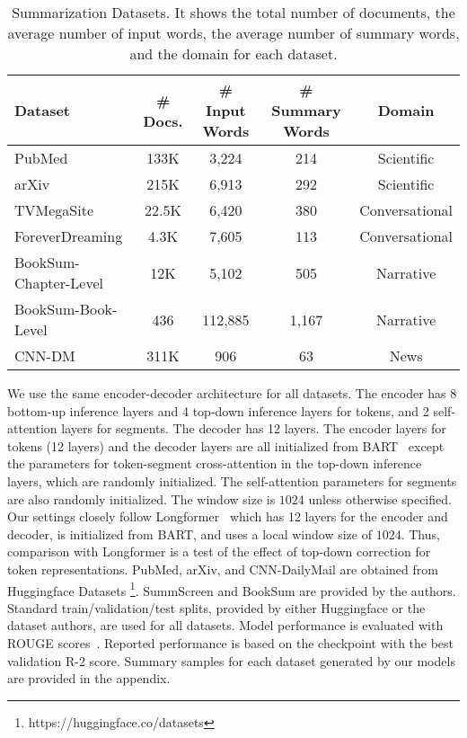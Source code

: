 \documentclass{article} \usepackage{iclr2022_conference,times}
\begin{document}
\begin{table*}[h!]
\small
\centering
\begin{tabular}{l c c c c} 
\toprule
Dataset & \# Docs. & \# Input Words & \# Summary Words & Domain\\
\hline
PubMed &133K & 3,224 & 214 & Scientific \\ 
arXiv &215K & 6,913 & 292 & Scientific \\ 
TVMegaSite & 22.5K & 6,420 & 380 & Conversational \\
ForeverDreaming & 4.3K & 7,605 & 113  & Conversational \\
BookSum-Chapter-Level & 12K & 5,102 & 505 & Narrative \\
BookSum-Book-Level & 436 & 112,885 & 1,167 & Narrative \\
CNN-DM & 311K & 906 & 63 & News \\ 
\hline
\end{tabular}
\caption{\scriptsize Summarization Datasets. It shows the total number of documents, the average number of input words, the average number of summary words, and the domain for each dataset.}
\label{table:datasets}
\end{table*}


We use the same encoder-decoder architecture for all datasets. The encoder has 8 bottom-up inference layers and 4 top-down inference layers for tokens, and 2 self-attention layers for segments. The decoder has 12 layers. The encoder layers for tokens (12 layers) and the decoder layers are all initialized from BART~\citep{lewis-etal-2020-bart} except the parameters for token-segment cross-attention in the top-down inference layers, which are randomly initialized. The self-attention parameters for segments are also randomly initialized. The window size is $1024$ unless otherwise specified. Our settings closely follow Longformer~\citep{beltagy2020longformer} which has 12 layers for the encoder and decoder, is initialized from BART, and uses a local window size of $1024$. Thus, comparison with Longformer is a test of the effect of top-down correction for token representations. PubMed, arXiv, and CNN-DailyMail are obtained from Huggingface Datasets \footnote{https://huggingface.co/datasets}. SummScreen and BookSum are provided by the authors. Standard train/validation/test splits, provided by either Huggingface or the dataset authors, are used for all datasets. Model performance is evaluated with ROUGE scores~\citep{lin-2004-rouge}. Reported performance is based on the checkpoint with the best validation R-2 score. Summary samples for each dataset generated by our models are provided in the appendix. 
\end{document}
